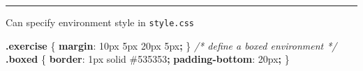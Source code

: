 \documentclass[
  a4paper,
  twoside,
  openright]{book}
\newenvironment{Shaded}{\begin{snugshade}}{\end{snugshade}}
\newcommand{\CharTok}[1]{\textcolor[rgb]{0.31,0.60,0.02}{#1}}
\newcommand{\CommentTok}[1]{\textcolor[rgb]{0.56,0.35,0.01}{\textit{#1}}}
\newcommand{\ConstantTok}[1]{\textcolor[rgb]{0.56,0.35,0.01}{#1}}
\newcommand{\DataTypeTok}[1]{\textcolor[rgb]{0.13,0.29,0.53}{#1}}
\newcommand{\DecValTok}[1]{\textcolor[rgb]{0.00,0.00,0.81}{#1}}
\newcommand{\FunctionTok}[1]{\textcolor[rgb]{0.13,0.29,0.53}{\textbf{#1}}}
\newcommand{\KeywordTok}[1]{\textcolor[rgb]{0.13,0.29,0.53}{\textbf{#1}}}
\newcommand{\NormalTok}[1]{#1}
\newcommand{\OperatorTok}[1]{\textcolor[rgb]{0.81,0.36,0.00}{\textbf{#1}}}
\theoremstyle{definition}
\theoremstyle{definition}
\theoremstyle{definition}
\theoremstyle{definition}
\theoremstyle{remark}
\begin{document}
\begin{center}\rule{0.5\linewidth}{0.5pt}\end{center}

Can specify environment style in \texttt{style.css}

\begin{Shaded}
\begin{Highlighting}[]
\FunctionTok{.exercise}\NormalTok{ \{}
    \KeywordTok{margin}\CharTok{:} \DecValTok{10}\DataTypeTok{px} \DecValTok{5}\DataTypeTok{px} \DecValTok{20}\DataTypeTok{px} \DecValTok{5}\DataTypeTok{px}\OperatorTok{;} 
\NormalTok{\}}
\CommentTok{/* define a boxed environment */}
\FunctionTok{.boxed}\NormalTok{ \{}
    \KeywordTok{border}\CharTok{:} \DecValTok{1}\DataTypeTok{px} \DecValTok{solid} \ConstantTok{\#535353}\OperatorTok{;}
    \KeywordTok{padding{-}bottom}\CharTok{:} \DecValTok{20}\DataTypeTok{px}\OperatorTok{;}
\NormalTok{\}}
\end{Highlighting}
\end{Shaded}
\end{document}
